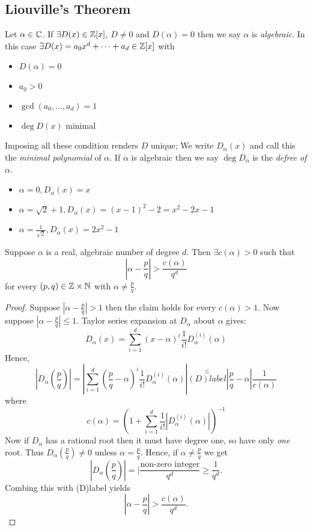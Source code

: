 \documentclass[NumTh.tex]{subfiles}
\begin{document}
\subsection{Liouville's Theorem}
Let $\alpha \in \mathbb{C}$. If $\exists D(x) \in \mathbb{Z}[x]$, $D \neq 0$ and $D(\alpha) = 0$ then we say $\alpha$ is \emph{algebraic}.
In this case $\exists D(x) = a_0 x^d + \dots + a_d \in \mathbb{Z}[x]$ with
\begin{itemize}
  \item $D(\alpha) = 0$
  \item $a_0 > 0$
  \item $\gcd(a_0,\dots,a_d) = 1$
  \item $\deg D(x)$ minimal
\end{itemize}
Imposing all these condition renders $D$ unique; We write $D_\alpha(x)$ and call this the \emph{minimal polynomial} of $\alpha$.
If $\alpha$ is algebraic then we say $\deg D_\alpha$ is the \emph{defree of $\alpha$}.

\begin{ex}
  \begin{itemize}
    \item $\alpha = 0, D_\alpha(x) = x$
    \item $\alpha = \sqrt{2} + 1, D_\alpha(x) = (x -1)^2 - 2 = x^2 -2x -1$
    \item $\alpha = \frac {1}{\sqrt{2}}, D_\alpha(x) = 2x^2 -1$
  \end{itemize}
\end{ex}

\begin{theorem}
  Suppose $\alpha$ is a real, algebraic number of degree $d$.
  Then $\exists c(\alpha) > 0$ such that
  \[ |\alpha - \frac{p}{q}| > \frac{c(\alpha)}{q^d} \]
  for every $(p,q) \in \mathbb{Z} \times \mathbb{N}$ with $\alpha \neq \frac{p}{q}$.
\end{theorem}

\begin{proof}
  Suppose $|\alpha - \frac{p}{q} | > 1$ then the claim holds for every $c(\alpha) > 1$.
  Now suppose $|\alpha - \frac{p}{q}| \leq 1$. Taylor series expansion at $D_\alpha$ about $\alpha$ gives:
  \[ D_\alpha(x) = \sum_{i=1}^d (x - \alpha)^i \frac{1}{i!} D_\alpha^{(i)}(\alpha) \]
  Hence, 
  \[ |D_\alpha\left(\frac{p}{q}\right) | = | \sum_{i=1}^d \left(\frac{p}{q} - \alpha \right)^i \frac{1}{i!} D_\alpha^{(i)}(\alpha)| \overset{\leq}{(D)label} |\frac{p}{q} - \alpha | \frac{1}{c(\alpha)} \]
  where
  \[ c(\alpha) = \left( 1 + \sum_{i=1}^d \frac{1}{i!} |D_\alpha^{(i)}(\alpha) |\right)^{-1} \]
  Now if $D_\alpha$ has a rational root then it must have degree one, so have only \emph{one} root.
  Thus $D_\alpha \left(\frac{p}{q}\right) \neq 0$ unless $\alpha = \frac{p}{q}$.
  Hence, if $\alpha \neq \frac{p}{q}$ we get
  \[ | D_\alpha \left(\frac{p}{q}\right) | = | \frac{\text{non-zero integer}}{q^d} \geq \frac{1}{q^d}. \]
  Combing this with (D)label yields 
  \[ |\alpha - \frac{p}{q} | > \frac{c(\alpha)}{q^d}.\]
\end{proof}
\end{document}
